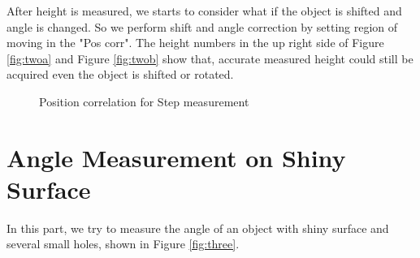 \documentclass[english]{article}
\begin{document}
After height is measured, we starts to consider what if the object is shifted and angle is changed. So we perform shift and angle correction by setting region of moving in the "Pos corr". The height numbers in the up right side of Figure \ref{fig:twoa} and Figure \ref{fig:twob} show that, accurate measured height could still be acquired even the object is shifted or rotated.\\

\begin{figure}[H]
	\centering
	\caption{Position correlation for Step measurement}
	\label{fig:two}
\end{figure}

\section*{Angle Measurement on Shiny Surface}
In this part, we try to measure the angle of an object with shiny surface and several small holes, shown in Figure \ref {fig:three}. \\ 
\end{document}
